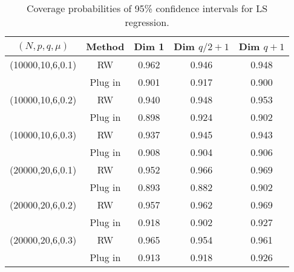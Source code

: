 \documentclass[12pt]{article}
\begin{document}
\begin{table}[!h]
	\centering
	\caption{Coverage probabilities of 95\% confidence intervals for LS regression. }
	\medskip
	\label{tab:sim1}
	\begin{tabular}{ccccc}
        \hline
		$(N, p, q, \mu)$ & Method &Dim 1& Dim $q/2+1$ & Dim $q+1$\\
		\hline\hline
		(10000,10,6,0.1) & RW & 0.962& 0.946 & 0.948\\
		&Plug in & 0.901& 0.917& 0.900\\
		\hline
		(10000,10,6,0.2) & RW & 0.940& 0.948& 0.953\\
		&Plug in & 0.898& 0.924& 0.902\\
		\hline
		(10000,10,6,0.3) & RW  & 0.937& 0.945& 0.943\\
		&Plug in & 0.908& 0.904& 0.906\\
		\hline
		(20000,20,6,0.1) & RW & 0.952& 0.966& 0.969\\
		&Plug in & 0.893& 0.882& 0.902\\
		\hline
		(20000,20,6,0.2)& RW & 0.957& 0.962& 0.969\\
		&Plug in & 0.918& 0.902& 0.927\\
		\hline
		(20000,20,6,0.3) & RW &0.965&0.954&0.961\\
		&Plug in & 0.913& 0.918& 0.926\\
		\hline
	\end{tabular}
\end{table}
\end{document}

